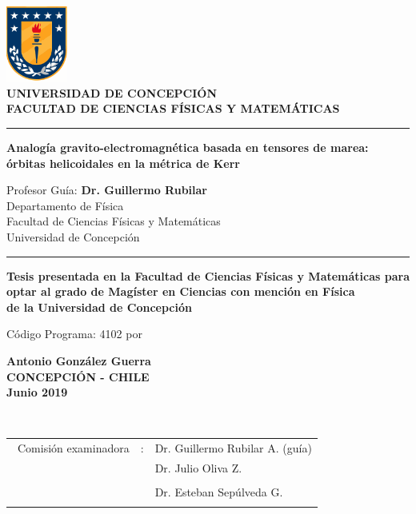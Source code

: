 \thispagestyle{empty}
\pagestyle{empty}
\begin{center}
	\includegraphics[width=2cm]{logo_udec}\\
	\vspace{0.3cm}
	\textbf{UNIVERSIDAD DE CONCEPCI\'ON} \\ 
	\textbf{FACULTAD DE CIENCIAS F\'ISICAS Y MATEM\'ATICAS} \\
	\vspace{0.6cm}	
	\rule{14.5cm}{0.1cm}
	\vspace{0.5cm}

	
	{\Large \textbf{Analogía gravito-electromagnética basada en tensores de marea: órbitas helicoidales en la métrica de Kerr}}
	
	\vspace{1.0cm}
	
	{ Profesor Gu\'ia: \textbf{Dr. Guillermo Rubilar}\\ 
		Departamento de F\'isica \\ 
		Facultad de Ciencias F\'isicas y Matem\'aticas \\
		Universidad de Concepci\'on}
	
	\vspace{0.7cm}
	\rule{14.5cm}{0.1cm}
	\vspace{0.35cm}	
	
	
\textbf{Tesis presentada en la Facultad de Ciencias F\'isicas y Matem\'aticas para optar al grado de Mag\'ister en Ciencias con menci\'on en F\'isica\\
de la Universidad de Concepci\'on}

C\'odigo Programa: 4102
	\vfill
	por
	
	\textbf{Antonio Gonz\'alez Guerra \\ 
	CONCEPCI\'ON -  CHILE \\
	Junio 2019}
\end{center}

\thispagestyle{empty} 
\newpage

\pagestyle{myheadings}
\ \\
\vspace{10cm}
\vfill
\hspace{2.5cm}
\begin{tabular}[c]{lll}
	\ Comisi\'on examinadora & : & Dr. Guillermo Rubilar A. (gu\'ia)
	\bigskip
	\\
	\large & &  Dr. Julio Oliva Z. \\ \\
	& & Dr. Esteban Sep\'ulveda G.\\ \\
\end{tabular}
\thispagestyle{empty}
